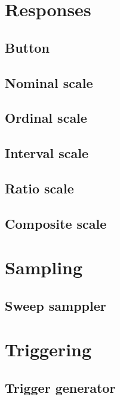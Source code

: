 \section{Responses}

\subsection{Button}

\subsection{Nominal scale}

\subsection{Ordinal scale}

\subsection{Interval scale}

\subsection{Ratio scale}

\subsection{Composite scale}

\section{Sampling}

\subsection{Sweep samppler}

\section{Triggering}

\subsection{Trigger generator}

